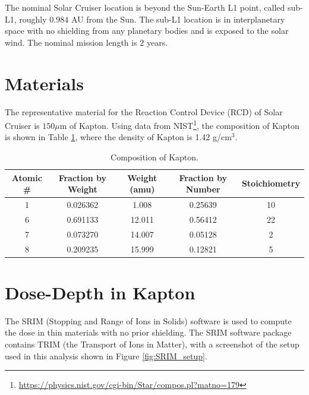 \documentclass{hitec}
\begin{document}
The nominal Solar Cruiser location is beyond the Sun-Earth L1 point, called sub-L1, roughly $0.984$ AU from the Sun. The sub-L1 location is in interplanetary space with no shielding from any planetary bodies and is exposed to the solar wind. The nominal mission length is 2 years.

\section{Materials}
\label{sec:Materials}
The representative material for the Reaction Control Device (RCD) of Solar Cruiser is $150 \mu\text{m}$ of Kapton. Using data from NIST\footnote{\url{https://physics.nist.gov/cgi-bin/Star/compos.pl?matno=179}}, the composition of Kapton is shown in Table \ref{tab:Kapton_composition}, where the density of Kapton is 1.42 g/cm$^3$.

\begin{table}[!h]\centering
	\caption{Composition of Kapton.}\label{tab:Kapton_composition}
	\begin{tabular}{|c | c | c | c | c |}\hline
		Atomic \# & Fraction by Weight & Weight (amu) & Fraction by Number & Stoichiometry\\\hline
		1	& 0.026362	&  1.008 & 0.25639 & 10\\\hline
		6	& 0.691133	& 12.011 & 0.56412 & 22\\\hline
		7	& 0.073270	& 14.007 & 0.05128 &  2\\\hline
		8	& 0.209235	& 15.999 & 0.12821 &  5\\\hline	
	\end{tabular}
\end{table}

\section{Dose-Depth in Kapton}

The SRIM (Stopping and Range of Ions in Solids) software is used to compute the dose in thin materials with no prior shielding. The SRIM software package contains TRIM (the Transport of Ions in Matter), with a screenshot of the setup used in this analysis shown in Figure \ref{fig:SRIM_setup}.
\end{document}
